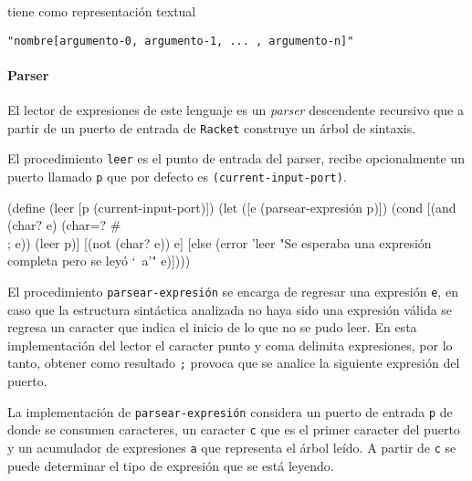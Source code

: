 \documentclass[letterpaper,twoside,openright,10pt]{book}
\begin{document}
tiene como representación textual

{\tt{}"nombre[argumento-0,\ argumento-1,\ ...\ ,\ argumento-n]"}

\paragraph{Parser} El lector de expresiones de este lenguaje es un \emph{parser} descendente recursivo que a partir de un puerto de entrada de {\tt{}Racket} construye un árbol de sintaxis.

El procedimiento {\tt{}\protect{}leer} es el punto de entrada del parser, recibe opcionalmente un puerto llamado {\tt{}p} que por defecto es {\tt{}(current-input-port)}.

\nwenddocs{}\endmoddef
(define (leer [p (current-input-port)])
  (let ([e (parsear-expresión p)])
    (cond
     [(and (char? e) (char=? #\\; e))
      (leer p)]
     [(not (char? e))
      e]
     [else
      (error 'leer "Se esperaba una expresión completa pero se leyó `~a'" e)])))

\eatline
{}\nwendcode{}\nwdocspar

El procedimiento {\tt{}\protect{}parsear-expresión} se encarga de regresar una expresión {\tt{}e}, en caso que la estructura sintáctica analizada no haya sido una expresión válida se regresa un caracter que indica el inicio de lo que no se pudo leer. En esta implementación del lector el caracter punto y coma delimita expresiones, por lo tanto, obtener como resultado {\tt{}{}{};} provoca que se analice la siguiente expresión del puerto.

La implementación de {\tt{}\protect{}parsear-expresión} considera un puerto de entrada {\tt{}p} de donde se consumen caracteres, un caracter {\tt{}c} que es el primer caracter del puerto y un acumulador de expresiones {\tt{}a} que representa el árbol leído. A partir de {\tt{}c} se puede determinar el tipo de expresión que se está leyendo.
\end{document}
